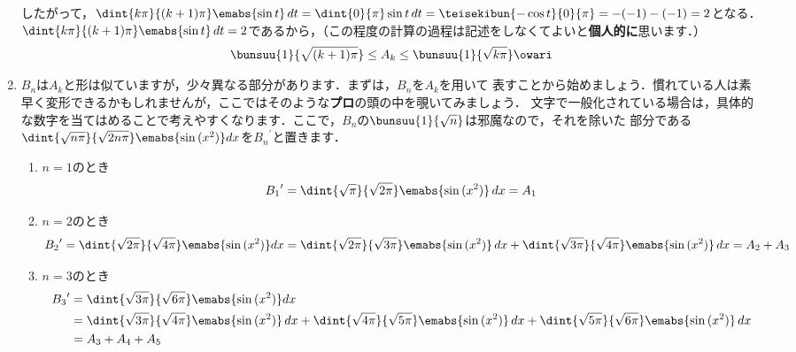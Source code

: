 \documentclass[../../../doc/main]{subfiles}
\begin{document}
\begin{enumerate}
            \textcolor{myBlue2}{したがって，$\dint{k\pi}{(k+1)\pi}\emabs{\sin{t}}\,dt=\dint{0}{\pi}\sin{t}\,dt=\teisekibun{-\cos{t}}{0}{\pi}=-(-1)-(-1)=2$となる．} \\
            $\dint{k\pi}{(k+1)\pi}\emabs{\sin{t}}\,dt=2$であるから，\textcolor{myBlue2}{（この程度の計算の過程は記述をしなくてよいと{\bf 個人的に}思います．）}
            \begin{align*}
                \bunsuu{1}{\sqrt{(k+1)\pi}}\leq A_k \leq \bunsuu{1}{\sqrt{k\pi}}\owari
            \end{align*}
            \item [\kakkoni] \textcolor{myBlue2}{$B_n$は$A_k$と形は似ていますが，少々異なる部分があります．まずは，$B_n$を$A_k$を用いて
            表すことから始めましょう．慣れている人は素早く変形できるかもしれませんが，ここではそのような{\bf プロ}の頭の中を覗いてみましょう．
            文字で一般化されている場合は，具体的な数字を当てはめることで考えやすくなります．ここで，$B_n$の$\bunsuu{1}{\sqrt{n}}$は邪魔なので，それを除いた
            部分である$\dint{\sqrt{n\pi}}{\sqrt{2n\pi}}\emabs{\sin{(x^2)}}dx$を${B_n}^\prime$と置きます．
            \begin{enumerate}
                \item [\tokeiichi] $n=1$のとき
                \begin{align*}
                    {B_1}^\prime=\dint{\sqrt{\pi}}{\sqrt{2\pi}}\emabs{\sin{(x^2)}}\,dx=A_1
                \end{align*}
                \item [\tokeini] $n=2$のとき
                \begin{align*}
                    {B_2}^\prime&=\dint{\sqrt{2\pi}}{\sqrt{4\pi}}\emabs{\sin{(x^2)}}dx 
                    =\dint{\sqrt{2\pi}}{\sqrt{3\pi}}\emabs{\sin{(x^2)}}\,dx+\dint{\sqrt{3\pi}}{\sqrt{4\pi}}\emabs{\sin{(x^2)}}\,dx 
                    =A_2+A_3
                \end{align*}
                \item [\tokeisan] $n=3$のとき
                \begin{align*}
                    {B_3}^\prime&=\dint{\sqrt{3\pi}}{\sqrt{6\pi}}\emabs{\sin{(x^2)}}dx \\
                    &=\dint{\sqrt{3\pi}}{\sqrt{4\pi}}\emabs{\sin{(x^2)}}\,dx+\dint{\sqrt{4\pi}}{\sqrt{5\pi}}\emabs{\sin{(x^2)}}\,dx+\dint{\sqrt{5\pi}}{\sqrt{6\pi}}\emabs{\sin{(x^2)}}\,dx \\
                    &=A_3+A_4+A_5
                \end{align*}

\end{enumerate}}
\end{enumerate}
\end{document}
